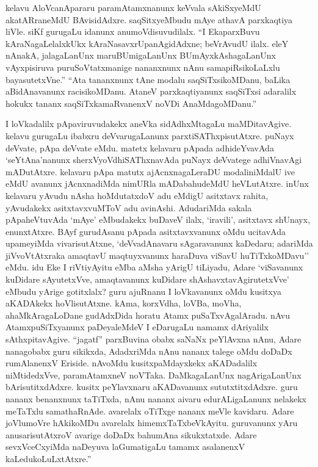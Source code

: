 kelavu AloVcanApararu paramAtamxnanunx keVvala sAkiSxyeMdU akatARraneMdU BAvisidAdxre. saqSitxyeMbudu mAye athavA parxkaqtiya liVle. siKf gurugaLu \hbox{idanunx} anumoVdisuvudilalx. ``I EkaparxBuvu kAraNagaLelalxkUkx kAraNasavxrUpa\-nAgidAdxne; beVrAvudU ilalx. eleY nAnakA, jalagaLanUnx maruBUmigaLanUnx BUmAyxkAsha\-gaLanUnx vAyxpisiruva puruSoVtatxmanige nananxnunx nAnu samapiRsikoLaLxlu bayasutetxVne.'' ``Ata tananxnunx tAne modalu saqSiTxsikoMDanu, baLika aBidAnavanunx racisikoMDanu. AtaneV parxkaqtiyanunx saqSiTxsi adaralilx hokukx tananx saqSiTxkamaRvanenxV noVDi AnaMdagoMDanu.''

I loVkadalilx pApaviruvudakekx aneVka sidAdhxMtagaLu maMDitavAgive. kelavu gurugaLu ibabxru deVvarugaLanunx parxtiSAThxpisutAtxre. puNayx deVvate, pApa deVvate eMdu. matetx kelavaru pApada adhideYvavAda `seYtAna'nanunx sherxVyoVdhiSAThxnavAda puNayx deVvatege adhiVnavAgi mADutAtxre. kelavaru pApa matutx ajAcnxnagaLeraDU modaliniMdalU ive eMdU avanunx jAcnxnadiMda nimURla mADabahudeMdU heVLutAtxre. inUnx kelavaru yAvudu nAsha hoMdutatxdoV adu eMdigU asitxtavx rahita, yAvudakekx asitxtavxvuMToV adu avinAshi. AdudariMda sakala pApaheVtuvAda `mAye' eMbudakekx buDaveV ilalx, `iravili', asitxtavx shUnayx, enunxtAtxre. BAyf gurudAsanu pApada asitxtavxvanunx oMdu ucitavAda upameyiMda vivarisutAtxne, `deVvadAnavaru sAgaravanunx kaDedaru; adariMda jiVvoVtAtxraka amaqtavU maqtuyxvanunx haraDuva viSavU huTiTxkoMDavu'' eMdu. idu Eke I riVtiyAyitu eMba aMsha yArigU tiLiyadu, Adare `viSavanunx kuDidare sAyutetxVve, amaqtavanunx kuDidare shAshavxtavAgirutetxVve' eMbudu yArige gotitxlalx? guru ajuRnanu I loVkavanunx oMdu kusitxya aKADAkekx hoVlisutAtxne. kAma, korxVdha, loVBa, moVha, ahaMkAragaLoDane gudAdxDida horatu Atamx puSaTxvAgalAradu. nAvu AtamxpuSiTxyanunx paDeyaleMdeV I eDarugaLu namamx dAriyalilx sAthxpitavAgive. ``jagatf'' parxBuvina obabx saNaNx peYlAvxna nAnu, Adare nanagobabx guru sikikxda, AdadxriMda nAnu nananx talege oMdu doDaDx rumAlanenxV Eriside. nAvoMdu kusitxpaMdayxkekx aKADadalilx niMtidedxVve, paramAtamxneV noVTaka. DaMkagaLanUnx nagArigaLanUnx bArisutitxdAdxre. kusitx peYlavxnaru aKADavanunx sututxtitxdAdxre. guru nananx benanxnunx taTiTxda, nAnu nananx aivaru edurALigaLanunx nelakekx meTaTxlu samathaRnAde. avarelalx oTiTxge nananx meVle kavidaru. Adare joVlumoVre hAkikoMDu avarelalx himemxTaTxbeVkAyitu. guruvanunx yAru anusarisutAtxroV avarige doDaDx bahumAna sikukxtatxde. Adare sevxVceCxyiMda naDeyuva laGumatigaLu tamamx asalanenxV kaLedukoLuLxtAtxre.''

